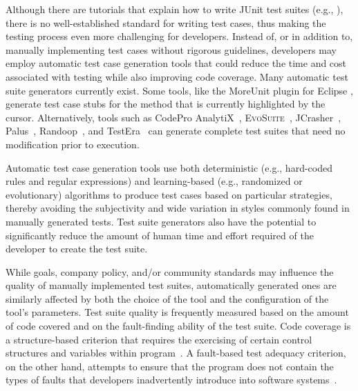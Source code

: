 

Although there are tutorials that explain how to write JUnit test suites (e.g., \cite{vogella2013}), there is no well-established standard for writing test cases, thus making the testing process even more challenging for developers.  Instead of, or in addition to, manually implementing test cases without rigorous guidelines, developers may employ automatic test case generation tools that could reduce the time and cost associated with testing while also improving code coverage.  Many automatic test suite generators currently exist.  Some tools, like the MoreUnit plugin for Eclipse \cite{moreunit}, generate test case stubs for the method that is currently highlighted by the cursor.  Alternatively, tools such as CodePro AnalytiX~\cite{CodePro1}, \textsc{EvoSuite}~\cite{fraser:2011:eat:2025113.2025179}, JCrasher~\cite{csallner2004}, Palus~\cite{zhang:2011:pha:1985793.1986036}, Randoop~\cite{pacheco2007feedback}, and TestEra~\cite{marinov:2001:tnf:872023.872551} can generate complete test suites that need no modification prior to execution.



Automatic test case generation tools use both deterministic (e.g., hard-coded rules and regular expressions) and
learning-based (e.g., randomized or evolutionary) algorithms to produce test cases based on particular strategies,
thereby avoiding the subjectivity and wide variation in styles commonly found in manually generated tests.  Test suite
generators also have the potential to significantly reduce the amount of human time and effort required of the developer
to create the test suite.  


While goals, company policy, and/or community standards may influence the quality of manually implemented test suites, automatically generated ones are similarly affected by both the choice of the tool and the configuration of the tool's parameters.  Test suite quality is frequently measured based on the amount of code covered and on the fault-finding ability of the test suite.  Code coverage is a structure-based criterion that requires the exercising of certain control structures and variables within program~\cite{kapfhammer-testing-handbook}. A fault-based test adequacy criterion, on the other hand, attempts to ensure that the program does not contain the types of faults that developers inadvertently introduce into software systems~\cite{demillo1978hints, zhu1997software}.  

